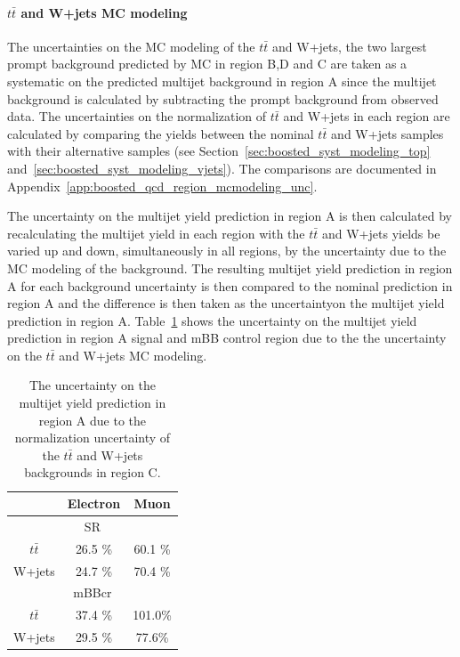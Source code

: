 \paragraph{$t\bar{t}$ and W+jets MC modeling}
 The uncertainties on the MC modeling
of the $t\bar{t}$ and W+jets, the two largest prompt background predicted by MC in region B,D and C
are taken as a systematic on the predicted multijet background in region A since the multijet
background is calculated by subtracting the prompt background from observed data. The uncertainties
on the normalization of $t\bar{t}$ and W+jets in each region are calculated by comparing the yields
between the nominal $t\bar{t}$ and W+jets samples with their alternative samples
(see Section~\ref{sec:boosted_syst_modeling_top} and~\ref{sec:boosted_syst_modeling_vjets}).
The comparisons are documented in Appendix~\ref{app:boosted_qcd_region_mcmodeling_unc}.
 
The uncertainty on the multijet yield prediction in region A is then calculated
by recalculating the multijet yield in each region with the $t\bar{t}$ and W+jets
yields be varied up and down, simultaneously in all regions, by the uncertainty due to the
MC modeling of the background. The resulting multijet yield prediction in region A for
each background uncertainty is then compared to the nominal prediction in region A and the difference is
then taken as the uncertaintyon the multijet yield prediction in region A.
Table~\ref{tab:boosted_syst_qcd_norm_ttbarwjetsregionc} shows the uncertainty on the multijet yield prediction
in region A signal and mBB control region  due to the the uncertainty on the $t\bar{t}$ and W+jets
MC modeling.
 
\begin{table}[!htbp]
\begin{center}
\begin{tabular}{c|c|c}
& Electron  & Muon  \\  
\hline
\multicolumn{3}{c}{SR} \\
\hline
$t\bar{t}$           &     26.5 \% &   60.1 \%  \\
W+jets               &     24.7 \% &   70.4 \%  \\
\hline
\multicolumn{3}{c}{mBBcr} \\
\hline
$t\bar{t}$           &  37.4  \%  &   101.0\%  \\
W+jets               &  29.5  \%  &   77.6\%   \\
\hline
\end{tabular}
\end{center}
\caption{The uncertainty on the multijet yield prediction in region A due to the normalization
uncertainty of the $t\bar{t}$ and W+jets backgrounds in region C.}
\label{tab:boosted_syst_qcd_norm_ttbarwjetsregionc}
\end{table}
 
